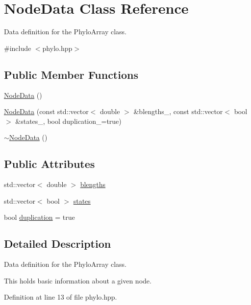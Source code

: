 \hypertarget{class_node_data}{}\section{Node\+Data Class Reference}
\label{class_node_data}


Data definition for the {\ttfamily Phylo\+Array} class.  




{\ttfamily \#include $<$phylo.\+hpp$>$}

\subsection*{Public Member Functions}
\begin{DoxyCompactItemize}
\item 
\hyperlink{class_node_data_a56da12a9de7c80c25a905012749c8671}{Node\+Data} ()
\item 
\hyperlink{class_node_data_a0a90191ba4c987afa3406f829967d8e2}{Node\+Data} (const std\+::vector$<$ double $>$ \&blengths\+\_\+, const std\+::vector$<$ bool $>$ \&states\+\_\+, bool duplication\+\_\+=true)
\item 
\hyperlink{class_node_data_ad870d466c40b9be96ad79adccab79038}{$\sim$\+Node\+Data} ()
\end{DoxyCompactItemize}
\subsection*{Public Attributes}
\begin{DoxyCompactItemize}
\item 
std\+::vector$<$ double $>$ \hyperlink{class_node_data_a02da5f097c105813216d87ef89ad7bd4}{blengths}
\item 
std\+::vector$<$ bool $>$ \hyperlink{class_node_data_a33caaadde6afe892624501bdb0edaea6}{states}
\item 
bool \hyperlink{class_node_data_a6c21d52091bb4fa6e3d431856da17caa}{duplication} = true
\end{DoxyCompactItemize}


\subsection{Detailed Description}
Data definition for the {\ttfamily Phylo\+Array} class. 

This holds basic information about a given node. 

Definition at line 13 of file phylo.\+hpp.



